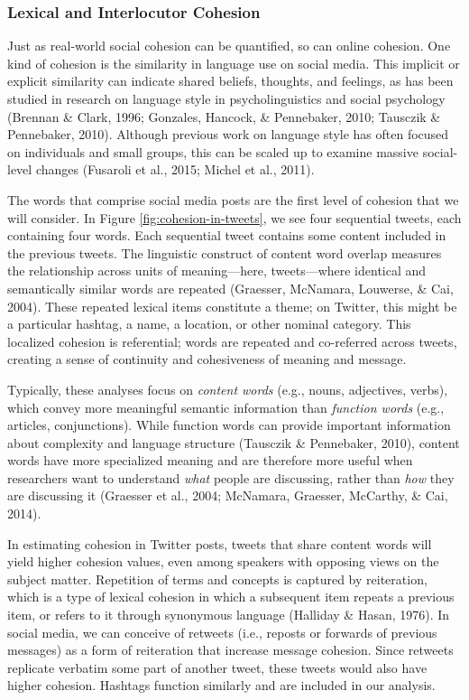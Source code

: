 \documentclass[english,man]{apa6}
\begin{document}
\hypertarget{lexical-and-interlocutor-cohesion}{%
\subsubsection{Lexical and Interlocutor Cohesion}\label{lexical-and-interlocutor-cohesion}}

Just as real-world social cohesion can be quantified, so can online cohesion.
One kind of cohesion is the similarity in language use on social
media. This implicit or explicit similarity can indicate shared
beliefs, thoughts, and feelings, as has been studied in research on language
style in psycholinguistics and social psychology (Brennan \& Clark, 1996; Gonzales, Hancock, \& Pennebaker, 2010; Tausczik \& Pennebaker, 2010). Although previous work on language style has often
focused on individuals and small groups, this can be scaled up to examine
massive social-level changes (Fusaroli et al., 2015; Michel et al., 2011).

The words that comprise social media posts are the first level of cohesion that
we will consider. In Figure \ref{fig:cohesion-in-tweets}, we see four
sequential tweets, each containing four words. Each sequential tweet contains
some content included in the previous tweets. The linguistic construct of
content word overlap measures the relationship across units of meaning---here,
tweets---where identical and semantically similar words are repeated
(Graesser, McNamara, Louwerse, \& Cai, 2004). These repeated lexical items constitute a theme; on Twitter,
this might be a particular hashtag, a name, a location, or other nominal
category. This localized cohesion is referential; words are repeated and
co-referred across tweets, creating a sense of continuity and cohesiveness of
meaning and message.

Typically, these analyses focus on \emph{content words} (e.g., nouns, adjectives,
verbs), which convey more meaningful semantic information than \emph{function words}
(e.g., articles, conjunctions). While function words can provide important
information about complexity and language structure
(Tausczik \& Pennebaker, 2010), content words have more specialized meaning and
are therefore more useful when researchers want to understand \emph{what} people are
discussing, rather than \emph{how} they are discussing it (Graesser et al., 2004; McNamara, Graesser, McCarthy, \& Cai, 2014).

In estimating cohesion in Twitter posts, tweets that share content words
will yield higher cohesion values, even among speakers with opposing
views on the subject matter. Repetition of terms and concepts is captured by
reiteration, which is a type of lexical cohesion in which a subsequent item
repeats a previous item, or refers to it through synonymous language
(Halliday \& Hasan, 1976). In social media, we can conceive of retweets (i.e., reposts
or forwards of previous messages) as a form of reiteration
that increase message cohesion. Since retweets replicate verbatim some part of
another tweet, these tweets would also have higher cohesion. Hashtags function
similarly and are included in our analysis.
\end{document}
